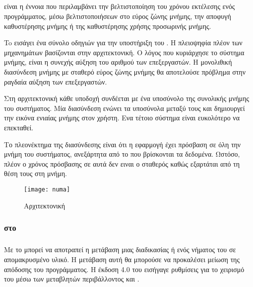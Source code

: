 \subsection{}
\subparagraph{}
\emph{} είναι η έννοια που περιλαμβάνει την βελτιστοποίηση του χρόνου εκτέλεσης ενός προγράμματος,
μέσω βελτιστοποιήσεων στο εύρος ζώνης μνήμης, την αποφυγή καθυστέρησης μνήμης ή της  καθυστέρησης χρήσης προσωρινής
μνήμης.

To \emph{} εισάγει ένα σύνολο οδηγιών για την υποστήριξη του \emph{}\cite{thread_affinity}. Η πλειοψηφία πλέον των μηχανημάτων βασίζονται στην \emph{} αρχιτεκτονική.
Ο λόγος που κυριάρχησε το σύστημα μνήμης, είναι η συνεχής αύξηση του αριθμού των επεξεργαστών. Η μονολιθική
διασύνδεση μνήμης με σταθερό εύρος ζώνης μνήμης θα αποτελούσε πρόβλημα στην ραγδαία αύξηση των επεξεργαστών.

Στη \emph{} αρχιτεκτονική κάθε υποδοχή συνδέεται με ένα υποσύνολο της συνολικής μνήμης του συστήματος. Μία
διασύνδεση ενώνει τα υποσύνολα μεταξύ τους και δημιουργεί την εικόνα ενιαίας μνήμης στον χρήστη. Ενα τέτοιο σύστημα
είναι ευκολότερο να επεκταθεί.

Το πλεονέκτημα της διασύνδεσης είναι ότι η εφαρμογή έχει πρόσβαση σε όλη την μνήμη του συστήματος, ανεξάρτητα από το που
βρίσκονται τα δεδομένα. Ωστόσο, πλέον ο χρόνος πρόσβασης σε αυτά δεν ειναι ο σταθερός καθώς εξαρτάται από τη θέση τους
στη μνήμη.


\begin{figure}[h]
\texttt{[image: numa]}
\centering
\captionsetup{justification=centering, singlelinecheck=false}
	\caption{Αρχιτεκτονική \cite{thenextstep152}}
\label{fig:numa}
\end{figure}

\clearpage
\subsubsection{\emph{} στο \emph{}}
\subparagraph{}
Με το \emph{} μπορεί να αποτραπεί η μετάβαση μιας διαδικασίας \emph{} ή ενός νήματος του
\emph{} σε απομακρυσμένο υλικό. Η μετάβαση αυτή θα μπορούσε να προκαλέσει μείωση της απόδοσης του
προγράμματος. Η έκδοση 4.0 του \emph{} εισήγαγε ρυθμίσεις για το χειρισμό του \emph{} μέσω των
μεταβλητών περιβάλλοντος  \emph{} και \emph{}\cite{affinity1}. \ \\

